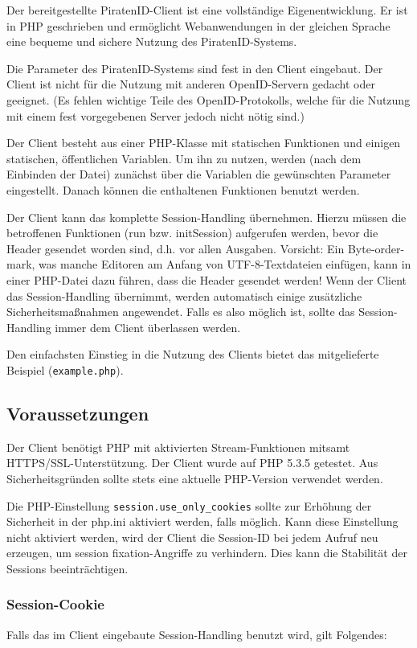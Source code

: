 Der bereitgestellte PiratenID-Client ist eine vollständige Eigenentwicklung.
Er ist in PHP geschrieben und ermöglicht Webanwendungen in der gleichen Sprache eine bequeme und sichere Nutzung des PiratenID-Systems.

Die Parameter des PiratenID-Systems sind fest in den Client eingebaut.
Der Client ist nicht für die Nutzung mit anderen OpenID-Servern gedacht oder geeignet.
(Es fehlen wichtige Teile des OpenID-Protokolls, welche für die Nutzung mit einem fest vorgegebenen Server jedoch nicht nötig sind.)

Der Client besteht aus einer PHP-Klasse mit statischen Funktionen und einigen statischen, öffentlichen Variablen.
Um ihn zu nutzen, werden (nach dem Einbinden der Datei) zunächst über die Variablen die gewünschten Parameter eingestellt.
Danach können die enthaltenen Funktionen benutzt werden.

Der Client kann das komplette Session-Handling übernehmen.
Hierzu müssen die betroffenen Funktionen (run bzw. initSession) aufgerufen werden, bevor die Header gesendet worden sind, d.h. vor allen Ausgaben.
Vorsicht: Ein Byte-order-mark, was manche Editoren am Anfang von UTF-8-Textdateien einfügen, kann in einer PHP-Datei dazu führen, dass die Header gesendet werden!
Wenn der Client das Session-Handling übernimmt, werden automatisch einige zusätzliche Sicherheitsmaßnahmen angewendet.
Falls es also möglich ist, sollte das Session-Handling immer dem Client überlassen werden.

Den einfachsten Einstieg in die Nutzung des Clients bietet das mitgelieferte Beispiel (\texttt{example.php}).

\subsection{Voraussetzungen}
Der Client benötigt PHP mit aktivierten Stream-Funktionen mitsamt HTTPS/SSL-Unterstützung.
Der Client wurde auf PHP 5.3.5 getestet.
Aus Sicherheitsgründen sollte stets eine aktuelle PHP-Version verwendet werden.

Die PHP-Einstellung \texttt{session.use\_only\_cookies} sollte zur Erhöhung der Sicherheit in der php.ini aktiviert werden, falls möglich.
Kann diese Einstellung nicht aktiviert werden, wird der Client die Session-ID bei jedem Aufruf neu erzeugen,
um session fixation-Angriffe zu verhindern.
Dies kann die Stabilität der Sessions beeinträchtigen.

\subsubsection{Session-Cookie}
Falls das im Client eingebaute Session-Handling benutzt wird, gilt Folgendes:


